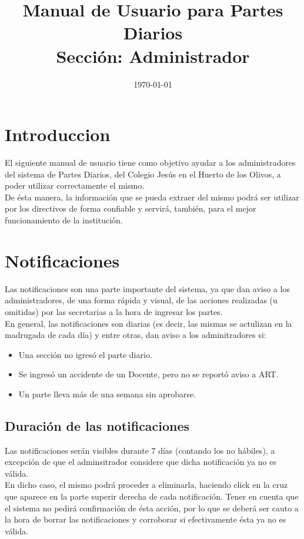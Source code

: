 \documentclass[12pt,a4paper]{article}
\title{Manual de Usuario para Partes Diarios \\ Sección: Administrador}
\begin{document}
\date{\today}
\maketitle

\section{Introduccion}

El siguiente manual de usuario tiene como objetivo ayudar a los administradores del sistema de Partes Diarios, del Colegio Jesús en el Huerto de los Olivos, a poder utilizar correctamente el mismo. \\
De ésta manera, la información que se pueda extraer del mismo podrá ser utilizar por los directivos de forma confiable y servirá, también, para el mejor funcionamiento de la institución.

\section{Notificaciones}

Las notificaciones son una parte importante del sistema, ya que dan aviso a los administradores, de una forma rápida y visual, de las acciones realizadas (u omitidas) por las secretarias a la hora de ingresar los partes. \\
En general, las notificaciones son diarias (es decir, las mismas se actulizan en la madrugada de cada día) y entre otras, dan aviso a los adminitradores si:
\begin{itemize}
	\item Una sección no igresó el parte diario.
	\item Se ingresó un accidente de un Docente, pero no se reportó aviso a ART.
	\item Un parte lleva más de una semana sin aprobarse.
\end{itemize}

\subsection{Duración de las notificaciones}
Las notificaciones serán visibles durante 7 días (contando los no hábiles), a excepción de que el adminsitrador considere que dicha notificación ya no es válida. \\
En dicho caso, el mismo podrá proceder a eliminarla, haciendo click en  la cruz que aparece en la parte superir derecha de cada notificación. Tener en cuenta que el sistema no pedirá confirmación de ésta acción, por lo que se deberá ser cauto a la hora de borrar las notificaciones y corroborar si efectivamente ésta ya no es válida.
\end{document}
